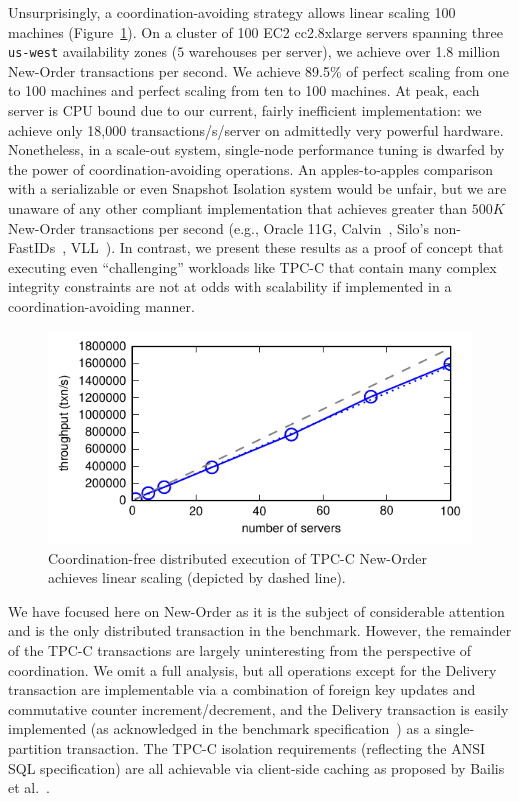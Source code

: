 Unsurprisingly, a coordination-avoiding strategy allows linear scaling
100 machines (Figure~\ref{fig:scaleout}). On a cluster of 100 EC2
cc2.8xlarge servers spanning three \texttt{us-west} availability zones
($5$ warehouses per server), we achieve over 1.8 million New-Order
transactions per second. We achieve 89.5\% of perfect scaling from one
to 100 machines and perfect scaling from ten to 100 machines. At peak,
each server is CPU bound due to our current, fairly inefficient
implementation: we achieve only 18,000 transactions/s/server on
admittedly very powerful hardware. Nonetheless, in a scale-out system,
single-node performance tuning is dwarfed by the power of
coordination-avoiding operations. An apples-to-apples comparison with
a serializable or even Snapshot Isolation system would be unfair, but
we are unaware of any other compliant implementation that achieves
greater than $500K$ New-Order transactions per second (e.g., Oracle
11G, Calvin~\cite{calvin}, Silo's non-FastIDs~\cite{silo},
VLL~\cite{abadi-vll}). In contrast, we present these results as a
proof of concept that executing even ``challenging'' workloads like
TPC-C that contain many complex integrity constraints are not at odds
with scalability if implemented in a coordination-avoiding manner.

\begin{figure}
\begin{center}
\includegraphics[width=\columnwidth]{figs/thru_scale.pdf}\vspace{-2em}
\end{center}
\caption{Coordination-free distributed execution of TPC-C New-Order
  achieves linear scaling (depicted by dashed line).}
\label{fig:scaleout}
\end{figure}

 We have focused here on New-Order
as it is the subject of considerable attention and is the only
distributed transaction in the benchmark. However, the remainder of
the TPC-C transactions are largely uninteresting from the perspective
of coordination. We omit a full analysis, but all operations except
for the Delivery transaction are implementable via a combination of
foreign key updates and commutative counter increment/decrement, and
the Delivery transaction is easily implemented (as acknowledged in the
benchmark specification~\cite{abadi-vll}) as a single-partition
transaction. The TPC-C isolation requirements (reflecting the ANSI SQL
specification) are all achievable via client-side caching as proposed
by Bailis et al.~\cite{hat-vldb}.


